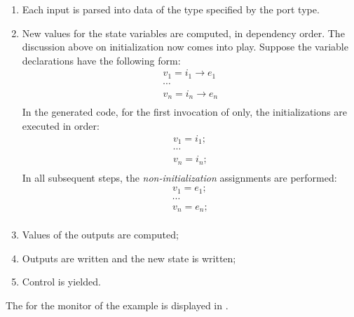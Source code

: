 \begin{enumerate}

\item Each input is parsed into data of the type specified by the port
  type.

\item New values for the state variables are computed, in dependency
  order. The discussion above on initialization now comes into
  play. Suppose the variable declarations have the following form:
\[
\begin{array}{l}
  v_1 = i_1 \longrightarrow e_1 \\
  \cdots \\
  v_n = i_n \longrightarrow e_n \\
\end{array}
\]
In the generated code, for the first invocation of  only,
the initializations are executed in order:
\[
\begin{array}{l}
  v_1 = i_1; \\
  \cdots \\
  v_n = i_n; \\
\end{array}
\]
In all subsequent steps, the \emph{non-initialization} assignments are performed:
\[
\begin{array}{l}
  v_1 = e_1; \\
  \cdots \\
  v_n = e_n; \\
\end{array}
\]

\item Values of the outputs are computed;

\item Outputs are written and the new state is written;

\item Control is yielded.
\end{enumerate}

The  for the monitor of the example is displayed in .

